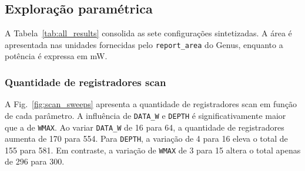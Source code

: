 \documentclass[conference]{IEEEtran}
\begin{document}
\subsection{Exploração paramétrica}

A Tabela~\ref{tab:all_results} consolida as sete configurações sintetizadas. A área é apresentada nas unidades fornecidas pelo \texttt{report\_area} do Genus, enquanto a potência é expressa em mW.

\begin{table}[!t]
\caption{Resultados consolidados da exploração paramétrica.}
\label{tab:all_results}
\centering
\scriptsize
{}
\end{table}

\subsubsection{Quantidade de registradores scan}

A Fig.~\ref{fig:scan_sweeps} apresenta a quantidade de registradores scan em função de cada parâmetro. A influência de \texttt{DATA\_W} e \texttt{DEPTH} é significativamente maior que a de \texttt{WMAX}. Ao variar \texttt{DATA\_W} de 16 para 64, a quantidade de registradores aumenta de 170 para 554. Para \texttt{DEPTH}, a variação de 4 para 16 eleva o total de 155 para 581. Em contraste, a variação de \texttt{WMAX} de 3 para 15 altera o total apenas de 296 para 300.
\end{document}
